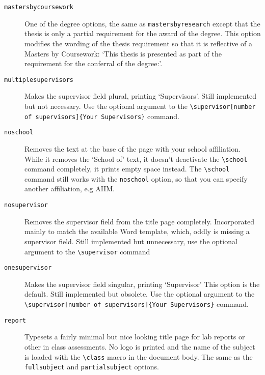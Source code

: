 \documentclass[12pt,oneside]{article}
\newcommand{\option}[1]{\texttt{\color{Green}#1}} %
\newcommand{\command}[1]{\texttt{\color{Red}#1}} %
\newcommand{\comoptions}[1]{\texttt{\color{Blue}#1}} %
\begin{document}
\begin{description}
    \item[\option{mastersbycoursework}]
    One of the degree options, the same as \option{mastersbyresearch} except that the thesis is only a partial requirement for the award of the degree. This option modifies the wording of the thesis requirement so that it is reflective of a Masters by Coursework: `This thesis is presented as part of the requirement for the conferral of the degree:'.
    
    \item[\option{multiplesupervisors}]
    Makes the supervisor field plural, printing `Supervisors'. Still implemented but not necessary. Use the optional argument to the \command{\textbackslash{}supervisor}\option{[number of supervisors]}\comoptions{\{Your Supervisors\}} command.
    
    \item[\option{noschool}]
    Removes the text at the base of the page with your school affiliation. While it removes the `School of' text, it doesn't deactivate the \command{\textbackslash{}school} command completely, it prints empty space instead. The \command{\textbackslash{}school} command still works with the \option{noschool} option, so that you can specify another affiliation, e.g AIIM.
    
    \item[\option{nosupervisor}]
    Removes the supervisor field from the title page completely. Incorporated mainly to match the available Word template, which, oddly is missing a supervisor field. Still implemented but unnecessary, use the optional argument to the \command{\textbackslash{}supervisor} command
    
    \item[\option{onesupervisor}]
    Makes the supervisor field singular, printing `Supervisor' This option is the default. Still implemented but obsolete. Use the optional argument to the \command{\textbackslash{}supervisor}\option{[number of supervisors]}\comoptions{\{Your Supervisors\}} command.
    
    \item[\option{report}]
    Typesets a fairly minimal but nice looking title page for lab reports or other in class assessments. No logo is printed and the name of the subject is loaded with the \command{\textbackslash{}class} macro in the document body. The same as the \option{fullsubject} and \option{partialsubject} options.
    
\end{description}
\end{document}
